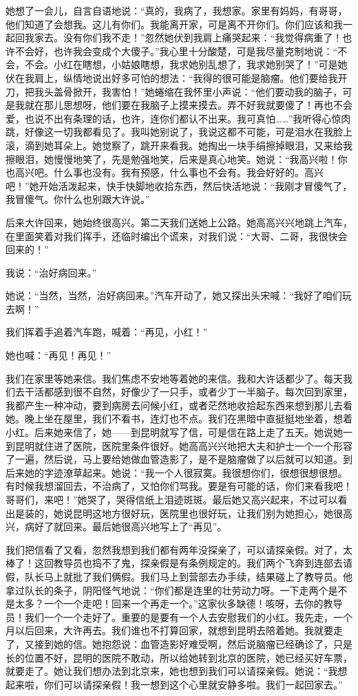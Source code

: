 她想了一会儿，自言自语地说：“真的，我病了，我想家。家里有妈妈，有哥哥，他们知道了会想我。这儿有你们。我能离开家，可是离不开你们。你们应该和我一起回我家去。没有你们我不走！”忽然她伏到我肩上痛哭起来：“我觉得病重了！也许不会好，也许我会变成个大傻子。”我心里十分酸楚，可是我尽量克制地说：“不会，不会。小红在瞎想，小姑娘瞎想，我求她别乱想了，我求她别哭了！”可是她伏在我肩上，纵情地说出好多可怕的想法：“我得的很可能是脑瘤。他们要给我开刀，把我头盖骨掀开，我害怕！”她蜷缩在我怀里小声说：“他们要动我的脑子，可是我就在那儿思想呀，他们要在我脑子上摸来摸去。弄不好我就要傻了！再也不会爱，也说不出有条理的话，也许，连你们都认不出来。我可真怕……”我听得心惊肉跳，好像这一切我都看见了。我叫她别说了，我说这都不可能，可是泪水在我脸上滚，滴到她耳朵上。她觉察了，跳开来看我。她掏出一块手绢擦掉眼泪，又来给我擦眼泪，她慢慢地笑了，先是勉强地笑，后来是真心地笑。她说：“我高兴啦！你也高兴吧。什么事也没有。我有预感，什么事也不会有。我会好好的。高兴吧！”她开始活泼起来，快手快脚地收拾东西，然后快活地说：“我刚才冒傻气了，我冒傻气。你什么也别跟大许说。” 

后来大许回来，她始终很高兴。第二天我们送她上公路。她高高兴兴地跳上汽车，在里面笑着对我们挥手，还临时编出个谎来，对我们说：“大哥、二哥，我很快会回来的！” 

我说：“治好病回来。” 

她说：“当然，当然，治好病回来。”汽车开动了，她又探出头宋喊：“我好了咱们玩去啊！” 

我们挥着手追着汽车跑，喊着：“再见，小红！” 

她也喊：“再见！再见！” 

我们在家里等她来信。我们焦虑不安地等着她的来信。我和大许话都少了。每天我们去干活都感到很不自然，好像少了一只手，或者少丁一半脑子。每次回到家里，我都产生一种冲动，要到病房去问候小红，或者茫然地收拾起东西来想到那儿去看她。晚上坐在屋里，我们不看书，连灯也不点。我们在黑暗中直挺挺地坐着，想着小红。后来她来信了，她——到昆明就写了信，可是信在路上走了五天。她说她一到昆明就住进了医院，医院里条件很好。她高高兴兴地把大夫和护士一个一个形容了一遍，然后说，马上要给她做血管造影了，是不是脑瘤做了以后就可以知道。到后来她的字迹潦草起来。她说：“我一个人很寂寞。我很想你们，很想很想很想。有时候我想溜回去，不治病了，又怕你们骂我。要是有可能的话，你们来看我吧！哥哥们，来吧！”她哭了，哭得信纸上泪迹斑斑。最后她又高兴起来，不过可以看出是装的，她说昆明这地方很好玩，医院里也很好玩，让我们别为她担心，她很高兴，病好了就回来。最后她很高兴地写上了“再见”。 

我们把信看了又看，忽然我想到我们都有两年没探亲了，可以请探亲假。对了，太棒了！这回教导员也捣不了鬼，探亲假是有条例规定的。我们两个飞奔到连部去请假，队长马上就批了我们俩假。我们马上到营部去办手续，结果碰上了教导员。他拿过队长的条子，阴阳怪气地说：“你们都是连里的壮劳动力呀。一下走两个是不是太多？一个一个走吧！回来一个再走一个。”这家伙多缺德！咳呀，去你的教导员！我们一个一个走好了。重要的是要有一个人去安慰我们的小红。我先走，一个月以后回来，大许再去。我们谁也不打算回家，就想到昆明去陪着她。我就要走了，又接到她的信。她抱怨说：血管造影好难受啊，然后说脑瘤已经确诊了，只是长的位置不好，昆明的医院不敢动，所以给她转到北京的医院，她已经买好车票，就要走了。她让我们想办法到北京来，她也想到我们可以请探亲假。她说：“我想起来啦，你们可以请探亲假！我一想到这个心里就安静多啦。我们一起回家去。” 

